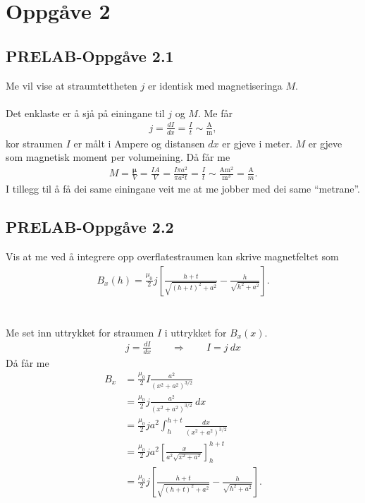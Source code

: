 \documentclass[11pt, a4paper]{article}
\newcommand{\vb}{\mathbf}
\begin{document}
\newpage


\section*{Oppgåve 2}

  \subsection*{PRELAB-Oppgåve 2.1}
    Me vil vise at straumtettheten $j$ er identisk med magnetiseringa $M$. \\ \\
    Det enklaste er å sjå på einingane til $j$ og $M$. Me får
    \begin{align*}
      j = \frac{dI}{dx} = \frac{I}{t} \sim \frac{\text{A}}{\text{m}},
    \end{align*}
    kor straumen $I$ er målt i Ampere og distansen $dx$ er gjeve i meter. $M$ er gjeve som magnetisk moment per volumeining. Då får me
    \begin{align*}
      M = \frac{\vb{\mu}}{V} = \frac{IA}{V} = \frac{I\pi a^2}{\pi a^2t} = \frac{I}{t} \sim \frac{\text{A}\text{m}^2}{\text{m}^3} = \frac{\text{A}}{{m}}.
    \end{align*}
    I tillegg til å få dei same einingane veit me at me jobber med dei same ``metrane''.

  \subsection*{PRELAB-Oppgåve 2.2}
    Vis at me ved å integrere opp overflatestraumen kan skrive magnetfeltet som
    \begin{align*}
      B_x(h) = \frac{\mu_0}{2}j\left[ \frac{h + t}{\sqrt{(h + t)^2 + a^2}} - \frac{h}{\sqrt{h^2 + a^2}} \right].
    \end{align*} \\ \\
    Me set inn uttrykket for straumen $I$ i uttrykket for $B_x(x)$.
    \begin{align*}
      j = \frac{dI}{dx} \qquad \Rightarrow \qquad I = j\ dx
    \end{align*}
    Då får me 
    \begin{align*}
      B_x &= \frac{\mu_0}{2}I \frac{a^2}{(x^2 + a^2)^{3/2}} \\
      &= \frac{\mu_0}{2}j\frac{a^2}{(x^2 + a^2)^{3/2}}\ dx \\
      &= \frac{\mu_0}{2}ja^2\int_h^{h + t}\frac{dx}{(x^2 + a^2)^{3/2}} \\
      &= \frac{\mu_0}{2}ja^2\left[ \frac{x}{a^2\sqrt{x^2 + a^2}} \right]_h^{h + t} \\
      &= \frac{\mu_0}{2}j\left[ \frac{h + t}{\sqrt{(h + t)^2 + a^2}} - \frac{h}{\sqrt{h^2 + a^2}} \right].
    \end{align*}
\end{document}

